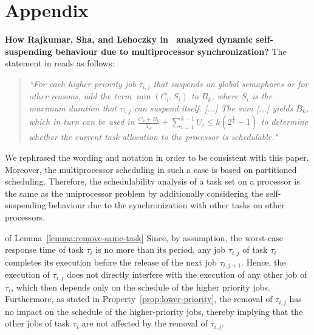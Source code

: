 \section*{Appendix}
{\bf How Rajkumar, Sha, and Lehoczky
  in~\cite[p. 267]{DBLP:conf/rtss/RajkumarSL88} analyzed dynamic
  self-suspending behaviour due to multiprocessor synchronization?}
The statement in \cite{DBLP:conf/rtss/RajkumarSL88} reads as follows:
\begin{quote}
\emph{``For each higher priority job $\tau_{i,j}$ that suspends on global semaphores or for other reasons, add the term $\min(C_i, S_i)$ to $B_k$, where $S_i$ is the maximum duration that $\tau_{i,j}$ can suspend itself. [...] The sum [...] yields $B_k$, which in turn can be used in 
$\frac{C_k+B_k}{T_k} + \sum_{i=1}^{k-1} U_i \leq k (2^{\frac{1}{k}}-1)$ to determine whether the current task allocation to the processor is schedulable."}
\end{quote}
  We rephrased the wording and notation in order to be consistent with this paper. Moreover, the multiprocessor scheduling in such a case is based on partitioned scheduling. Therefore, the schedulability analysis of a task set on a processor is the same as the uniprocessor problem by additionally considering the self-suspending behaviour due to the synchronization with other tasks on other processors.

\begin{appProof}{of Lemma~\ref{lemma:remove-same-task}}
Since, by assumption, the worst-case response time of task $\tau_i$ is no more than its period, any job $\tau_{i,j}$ of task $\tau_i$ completes its execution before the release of the next job $\tau_{i,j+1}$. Hence, the execution of $\tau_{i,j}$ does not directly interfere with the execution of any other job of $\tau_i$, which then depends only on the schedule of the higher priority jobs. Furthermore, as stated in Property~\ref{prop:lower-priority}, the removal of $\tau_{i,j}$ has no impact on the schedule of the higher-priority jobs, thereby implying that the other jobs of task $\tau_i$ are not affected by the removal of $\tau_{i,j}$.
\end{appProof}

